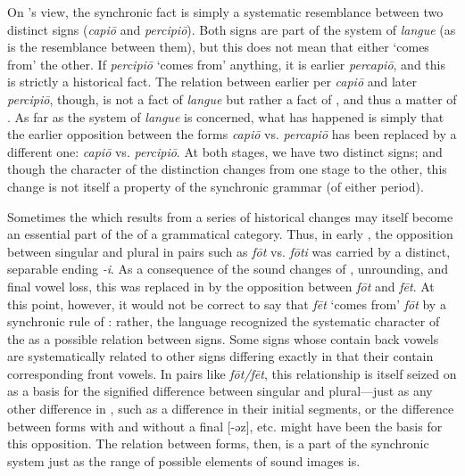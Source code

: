 On {\Saussure}'s view, the synchronic fact is simply a systematic
resemblance between two distinct signs (\emph{capiō} and
\emph{percipiō}). Both signs are part of the system of \emph{langue}
(as is the resemblance between them), but this does not mean that
either `comes from' the other. If \emph{percipiō} `comes from'
anything, it is earlier \emph{percapiō}, and this is strictly a
historical fact. The relation between earlier per \emph{capiō} and
later \emph{percipiō}, though, is not a fact of \emph{langue} but
rather a fact of , and thus a matter of
\emph{}. 
As far
as the system of \emph{langue} is concerned, what has happened is
simply that the earlier opposition between the forms \emph{capiō}
vs. \emph{percapiō} has been replaced by a different one: \emph{capiō}
vs. \emph{percipiō}. At both stages, we have two distinct signs; and
though the character of the distinction changes from one stage to the
other, this change is not itself a property of the synchronic grammar
(of either period).

Sometimes the  which results from a series of historical
changes may itself become an essential part of the \emph{}
of a grammatical category. Thus, in early , the opposition
between singular and plural in pairs such as \emph{fōt}
vs. \emph{fōti} was carried by a distinct, separable ending
\emph{-i}. As a consequence of the sound changes of ,
unrounding, and final vowel loss, this was replaced in  by
the opposition between \emph{fōt} and \emph{fēt}. At this point,
however, it would not be correct to say that  \emph{fēt}
`comes from' \emph{fōt} by a synchronic rule of : rather, the
language recognized the systematic character of the  as a
possible relation between signs. Some signs whose \emph{}
contain back vowels are systematically related to other signs
differing exactly in that their \emph{} contain
corresponding front vowels. In pairs like \emph{fōt/fēt}, this
relationship is itself seized on as a basis for the signified
difference between singular and plural—just as any other difference in
\emph{}, such as a difference in their initial segments, or
the difference between forms with and without a final [-əz],
etc. might have been the basis for this opposition. The relation
between forms, then, is a part of the synchronic system just as the
range of possible elements of sound images is.

